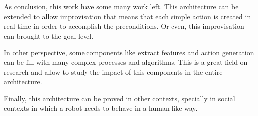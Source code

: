 As conclusion, this work have some many work left. This architecture can be extended to allow improvisation that means that each simple action is created in real-time in order to accomplish the preconditions. Or even, this improvisation can brought to the goal level.

In other perspective, some components like extract features and action generation can be fill with many complex processes and algorithms. This is a great field on research and allow to study the impact of this components in the entire architecture.

Finally, this architecture can be proved in other contexts, specially in social contexts in which a robot needs to behave in a human-like way.